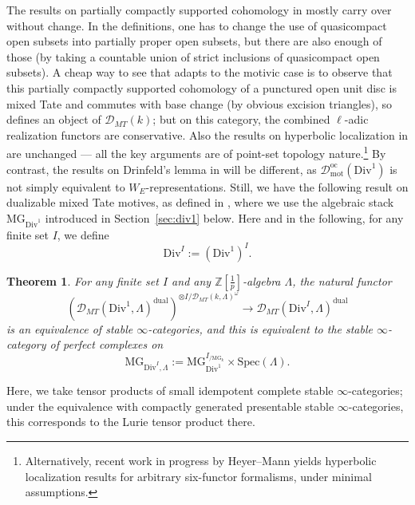 \documentclass[11pt]{amsart}
\numberwithin{equation}{section}
\newtheorem{theorem}{Theorem}
\numberwithin{theorem}{section}
\theoremstyle{definition}
\newcommand{\Div}{\mathrm{Div}}
\begin{document}
The results on partially compactly supported cohomology in \cite[Section IV.5]{FarguesScholze} mostly carry over without change. In the definitions, one has to change the use of quasicompact open subsets into partially proper open subsets, but there are also enough of those (by taking a countable union of strict inclusions of quasicompact open subsets). A cheap way to see that \cite[Lemma IV.5.1]{FarguesScholze} adapts to the motivic case is to observe that this partially compactly supported cohomology of a punctured open unit disc is mixed Tate and commutes with base change (by obvious excision triangles), so defines an object of $\mathcal D_{MT}(k)$; but on this category, the combined $\ell$-adic realization functors are conservative. Also the results on hyperbolic localization in \cite[Section IV.6]{FarguesScholze} are unchanged --- all the key arguments are of point-set topology nature.\footnote{Alternatively, recent work in progress by Heyer--Mann yields hyperbolic localization results for arbitrary six-functor formalisms, under minimal assumptions.} By contrast, the results on Drinfeld's lemma in \cite[Section IV.7]{FarguesScholze} will be different, as $\mathcal D_{\mathrm{mot}}^{\mathrm{oc}}(\Div^1)$ is not simply equivalent to $W_E$-representations. Still, we have the following result on dualizable mixed Tate motives, as defined in \cite[Definition 10.7]{BerkovichMotives}, where we use the algebraic stack $\mathrm{MG}_{\mathrm{Div}^1}$ introduced in Section~\ref{sec:div1} below. Here and in the following, for any finite set $I$, we define
\[
\mathrm{Div}^I := (\mathrm{Div}^1)^I.
\]

\begin{theorem}\label{thm:drinfeldlemma} For any finite set $I$ and any $\mathbb Z[\tfrac 1p]$-algebra $\Lambda$, the natural functor 
\[
(\mathcal D_{MT}(\mathrm{Div}^1,\Lambda)^{\mathrm{dual}})^{\otimes I/\mathcal D_{MT}(k,\Lambda)^\omega}\to \mathcal D_{MT}(\mathrm{Div}^I,\Lambda)^{\mathrm{dual}}
\]
is an equivalence of stable $\infty$-categories, and this is equivalent to the stable $\infty$-category of perfect complexes on
\[
\mathrm{MG}_{\mathrm{Div}^I,\Lambda} := \mathrm{MG}_{\mathrm{Div}^1}^{I_{/\mathrm{MG}_k}}\times \mathrm{Spec}(\Lambda).
\]
\end{theorem}

Here, we take tensor products of small idempotent complete stable $\infty$-categories; under the equivalence with compactly generated presentable stable $\infty$-categories, this corresponds to the Lurie tensor product there.
\end{document}
